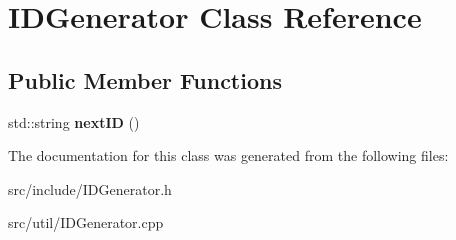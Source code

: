 \hypertarget{classIDGenerator}{\section{I\-D\-Generator Class Reference}
\label{classIDGenerator}
}
\subsection*{Public Member Functions}
\begin{DoxyCompactItemize}
\item 
\hypertarget{classIDGenerator_a223bf057a0ad9e69df527142dfe1e91b}{std\-::string {\bfseries next\-I\-D} ()}\label{classIDGenerator_a223bf057a0ad9e69df527142dfe1e91b}

\end{DoxyCompactItemize}


The documentation for this class was generated from the following files\-:\begin{DoxyCompactItemize}
\item 
src/include/I\-D\-Generator.\-h\item 
src/util/I\-D\-Generator.\-cpp\end{DoxyCompactItemize}
